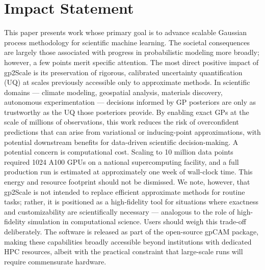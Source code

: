 \documentclass{article}
\begin{document}
\section*{Impact Statement}
This paper presents work whose primary goal is to advance scalable Gaussian process methodology for scientific machine learning. The societal consequences are largely those associated with progress in probabilistic modeling more broadly; however, a few points merit specific attention.
The most direct positive impact of gp2Scale is its preservation of rigorous, calibrated uncertainty quantification (UQ) at scales previously accessible only to approximate methods. In scientific domains --- climate modeling, geospatial analysis, materials discovery, autonomous experimentation --- decisions informed by GP posteriors are only as trustworthy as the UQ those posteriors provide. By enabling exact GPs at the scale of millions of observations, this work reduces the risk of overconfident predictions that can arise from variational or inducing-point approximations, with potential downstream benefits for data-driven scientific decision-making.
A potential concern is computational cost. Scaling to 10 million data points required 1024 A100 GPUs on a national supercomputing facility, and a full production run is estimated at approximately one week of wall-clock time. This energy and resource footprint should not be dismissed. We note, however, that gp2Scale is not intended to replace efficient approximate methods for routine tasks; rather, it is positioned as a high-fidelity tool for situations where exactness and customizability are scientifically necessary --- analogous to the role of high-fidelity simulation in computational science. Users should weigh this trade-off deliberately.
The software is released as part of the open-source gpCAM package, making these capabilities broadly accessible beyond institutions with dedicated HPC resources, albeit with the practical constraint that large-scale runs will require commensurate hardware.


\clearpage




\clearpage

\appendix
\end{document}
